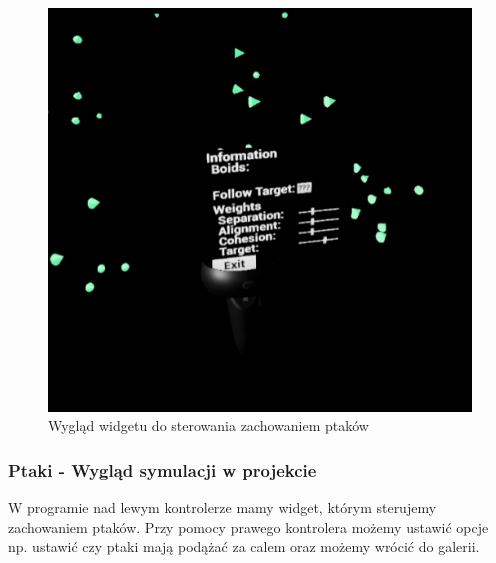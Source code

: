 \documentclass[a4paper,12pt,reqno]{article}
\begin{document}
\begin{figure}[H]%
\centering
\includegraphics[width=0.55\columnwidth]{graphics/boids/BP_BoidHud.png}
\caption{Wygląd widgetu do sterowania zachowaniem ptaków
\label{BPExample}}%
%
\qquad
\end{figure}  

\newpage
\subsubsection{Ptaki - Wygląd symulacji w projekcie}

W programie nad lewym kontrolerze mamy widget, którym sterujemy zachowaniem ptaków. Przy pomocy prawego kontrolera możemy ustawić opcje np. ustawić czy ptaki mają podążać za calem oraz możemy wrócić do galerii.

\end{document}
